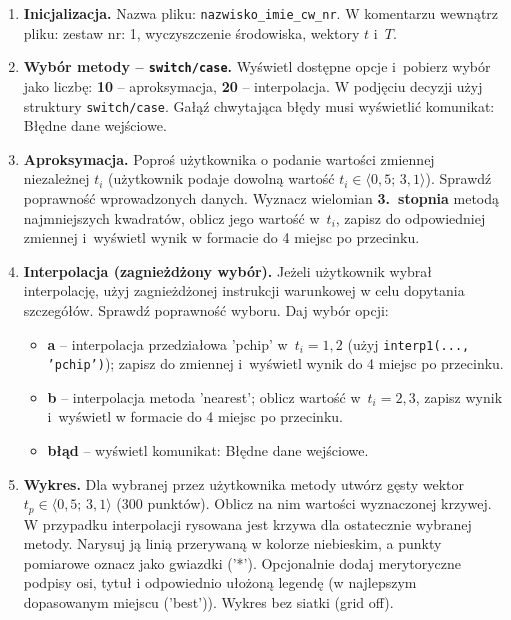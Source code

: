 \documentclass[a4paper,11pt]{article}
\begin{document}
\begin{enumerate}[leftmargin=*, label=\textbf{\arabic*.}, itemsep=2pt]

  \item \textbf{Inicjalizacja.}
    Nazwa pliku: \texttt{nazwisko\_imie\_cw\_nr}. W komentarzu wewnątrz pliku: zestaw nr: 1, wyczyszczenie środowiska, wektory $t$ i~$T$.

  \item \textbf{Wybór metody -- \texttt{switch/case}.}
    Wyświetl dostępne opcje i~pobierz wybór jako liczbę: \textbf{10} -- aproksymacja, \textbf{20} -- interpolacja. W podjęciu decyzji użyj struktury \texttt{switch/case}. Gałąź chwytająca błędy musi wyświetlić komunikat: Błędne dane wejściowe.

  \item \textbf{Aproksymacja.}
    Poproś użytkownika o podanie wartości zmiennej niezależnej $t_i$ (użytkownik podaje dowolną wartość $t_i \in \langle 0{,}5;\,3{,}1 \rangle$). Sprawdź poprawność wprowadzonych danych. Wyznacz wielomian \textbf{3.~stopnia} metodą najmniejszych kwadratów, oblicz jego wartość w~$t_i$, zapisz do odpowiedniej zmiennej i~wyświetl wynik w formacie do 4 miejsc po przecinku.

  \item \textbf{Interpolacja (zagnieżdżony wybór).}
    Jeżeli użytkownik wybrał interpolację, użyj zagnieżdżonej instrukcji warunkowej w celu dopytania szczegółów. Sprawdź poprawność wyboru. Daj wybór opcji:
    \begin{itemize}[itemsep=1pt]
      \item \textbf{a} -- interpolacja przedziałowa 'pchip' w~$t_i = 1{,}2$ (użyj \texttt{interp1(..., 'pchip')}); zapisz do zmiennej i~wyświetl wynik do 4 miejsc po przecinku.
      \item \textbf{b} -- interpolacja metoda 'nearest'; oblicz wartość w~$t_i = 2{,}3$, zapisz wynik i~wyświetl w formacie do 4 miejsc po przecinku.
      \item \textbf{błąd} -- wyświetl komunikat: Błędne dane wejściowe.
    \end{itemize}

  \item \textbf{Wykres.}
    Dla wybranej przez użytkownika metody utwórz gęsty wektor $t_p \in \langle 0{,}5;\,3{,}1 \rangle$ (300 punktów). Oblicz na nim wartości wyznaczonej krzywej. W przypadku interpolacji rysowana jest krzywa dla ostatecznie wybranej metody. Narysuj ją linią przerywaną w kolorze niebieskim, a punkty pomiarowe oznacz jako gwiazdki ('*'). Opcjonalnie dodaj merytoryczne podpisy osi, tytuł i odpowiednio ułożoną legendę (w najlepszym dopasowanym miejscu ('best')). Wykres bez siatki (grid off).

\end{enumerate}
\end{document}
